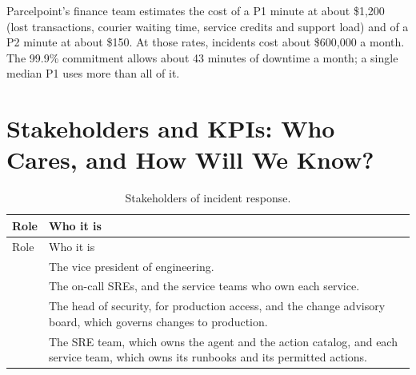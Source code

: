 Parcelpoint's finance team estimates the cost of a P1 minute at about \$1{,}200 (lost transactions, courier waiting time, service credits and support load) and of a P2 minute at about \$150. At those rates, incidents cost about \$600{,}000 a month. The 99.9\% commitment allows about 43 minutes of downtime a month; a single median P1 uses more than all of it.

\section{Stakeholders and KPIs: Who Cares, and How Will We Know?}
\label{sec:inc-kpis}

\begingroup
\small
\begin{xltabular}{\textwidth}{@{}>{\raggedright\arraybackslash}p{2.0cm}>{\raggedright\arraybackslash}X@{}}
\caption{Stakeholders of incident response.}\label{tab:inc-stakeholders}\\
\toprule
{} Role & Who it is \\
\midrule
\endfirsthead
\toprule
{} Role & Who it is \\
\midrule
\endhead
{} & The vice president of engineering. \\
 & The on-call SREs, and the service teams who own each service. \\
 & The head of security, for production access, and the change advisory board, which governs changes to production. \\
 & The SRE team, which owns the agent and the action catalog, and each service team, which owns its runbooks and its permitted actions. \\
\bottomrule
\end{xltabular}
\endgroup

